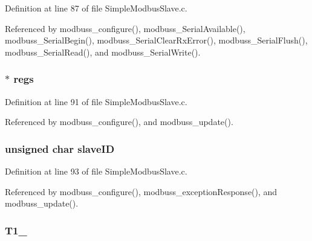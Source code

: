 Definition at line 87 of file Simple\-Modbus\-Slave.\-c.



Referenced by modbuss\-\_\-configure(), modbuss\-\_\-\-Serial\-Available(), modbuss\-\_\-\-Serial\-Begin(), modbuss\-\_\-\-Serial\-Clear\-Rx\-Error(), modbuss\-\_\-\-Serial\-Flush(), modbuss\-\_\-\-Serial\-Read(), and modbuss\-\_\-\-Serial\-Write().

\hypertarget{struct_m_o_d_b_u_s_s___d_a_t_a_a0c404e2fd21adae90a9b7df0526e835e}{
\subsubsection[{regs}]{$\ast$ regs}}\label{struct_m_o_d_b_u_s_s___d_a_t_a_a0c404e2fd21adae90a9b7df0526e835e}


Definition at line 91 of file Simple\-Modbus\-Slave.\-c.



Referenced by modbuss\-\_\-configure(), and modbuss\-\_\-update().

\hypertarget{struct_m_o_d_b_u_s_s___d_a_t_a_a4449d3474c101465e5039718e8130fce}{
\subsubsection[{slave\-I\-D}]{\setlength{\rightskip}{0pt plus 5cm}unsigned char slave\-I\-D}}\label{struct_m_o_d_b_u_s_s___d_a_t_a_a4449d3474c101465e5039718e8130fce}


Definition at line 93 of file Simple\-Modbus\-Slave.\-c.



Referenced by modbuss\-\_\-configure(), modbuss\-\_\-exception\-Response(), and modbuss\-\_\-update().

\hypertarget{struct_m_o_d_b_u_s_s___d_a_t_a_a958e218469d86d7b186a26e7c03ddcd9}{
\subsubsection[{T1\-\_\-5}]{ T1\-\_}}\label{struct_m_o_d_b_u_s_s___d_a_t_a_a958e218469d86d7b186a26e7c03ddcd9}


